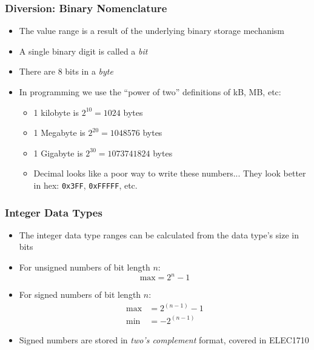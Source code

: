\documentclass[14pt]{beamer}
\begin{document}
\begin{frame}
\frametitle{Diversion: Binary Nomenclature}
\begin{itemize}
\item The value range is a result of the underlying binary storage mechanism
\item A single binary digit is called a \textit{bit}
\item There are 8 bits in a \textit{byte}
\item In programming we use the ``power of two'' definitions of kB, MB, etc:
	\begin{itemize}
		\item 1 kilobyte is $2^{10} = 1024$ bytes
		\item 1 Megabyte is $2^{20} = 1048576$ bytes
		\item 1 Gigabyte is $2^{30} = 1073741824$ bytes
		\item Decimal looks like a poor way to write these numbers... They look better in hex: \texttt{0x3FF}, \texttt{0xFFFFF}, etc.
	\end{itemize}
\end{itemize}
\end{frame}

\begin{frame}
\frametitle{Integer Data Types}
\begin{itemize}
\item The integer data type ranges can be calculated from the data type's size in bits
\item For unsigned numbers of bit length $n$:
\begin{equation}
\textrm{max} = 2^{n} - 1
\end{equation}
\item For signed numbers of bit length $n$:
\begin{align}
\textrm{max} &= 2^{(n-1)} - 1 \\
\textrm{min} &= -2^{(n-1)}
\end{align}
\item Signed numbers are stored in \textit{two's complement} format, covered in ELEC1710
\end{itemize}
\end{frame}
\end{document}
